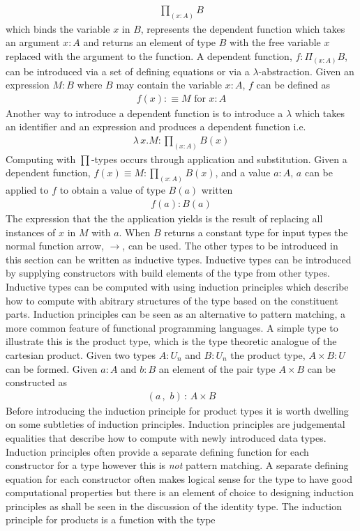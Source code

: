 \begin{align*}
    \prod_{(x : A)}B
\end{align*}
which binds the variable $x$ in $B$, represents the dependent function which takes
an argument $x : A$ and returns an element of type $B$ with the free variable
$x$ replaced with the argument to the function. A dependent function, $f :
\Pi_{(x : A)}B$, can be introduced via a set of defining equations or via a
$\lambda$-abstraction. Given an expression $M : B$ where $B$ may contain the
variable $x : A$, $f$ can be defined as
\begin{align*}
    f (x) :\equiv M \textrm{ for } x : A
\end{align*}
Another way to introduce a dependent function is to introduce a $\lambda$ which
takes an identifier and an expression and produces a dependent function i.e.
\begin{align*}
    \lambda \, x . M : \prod_{(x : A)}B(x)
\end{align*}
Computing with $\prod$-types occurs through application and substitution. Given
a dependent function, $f(x) \equiv M : \prod_{(x : A)}B(x)$, and a value $a : A$, $a$ can be
applied to $f$ to obtain a value of type $B(a)$ written
\begin{align*}
    f(a) : B(a)
\end{align*}
The expression that the the application yields is the result of replacing all
instances of $x$ in $M$ with $a$. When $B$ returns a constant type for input
types the normal function arrow, $\rightarrow$, can be used. The other types to
be introduced in this section can be written as inductive types. Inductive types
can be introduced by supplying constructors with build elements of the type from
other types. Inductive types can be computed with using induction principles
which describe how to compute with abitrary structures of the type based on the
constituent parts. Induction principles can be seen as an alternative to pattern
matching, a more common feature of functional programming languages. A simple
type to illustrate this is the product type, which is the type theoretic analogue of
the cartesian product. Given two types $A : U_{n}$ and $B : U_{n}$ the product
type, $A \times B : U$ can be formed. Given $a : A$ and $b : B$ an element of
the pair type $A \times B$ can be constructed as
\begin{align*}
    (a \, , \, \, b) \, : \, A \times B
\end{align*}
Before introducing the induction principle for product types it is worth
dwelling on some subtleties of induction principles. Induction principles are
judgemental equalities that describe how to compute with newly introduced
data types. Induction principles often provide a separate defining function for
each constructor for a type however this is \textit{not} pattern matching. A
separate defining equation for each constructor often makes logical sense for
the type to have good computational properties but there is an element of choice
to designing induction principles as shall be seen in the discussion of the
identity type. The induction principle for products is a function with the type

